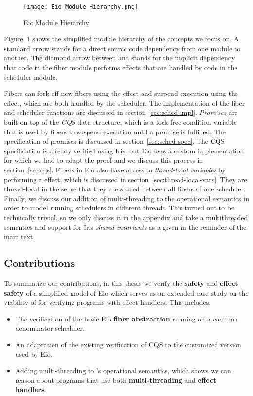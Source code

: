 \begin{figure}[ht]
  \centering
  \texttt{[image: Eio\_Module\_Hierarchy.png]}
  \caption{Eio Module Hierarchy}
  \label{fig:eio-module-hierarchy}
\end{figure}

Figure~\ref{fig:eio-module-hierarchy} shows the simplified module hierarchy of the concepts we focus on.
A standard arrow stands for a direct source code dependency from one module to another.
The diamond arrow between  and  stands for the implicit dependency that code in the fiber module performs effects that are handled by code in the scheduler module.

Fibers can fork off new fibers using the \efork{} effect and suspend execution using the \esuspend{} effect, which are both handled by the scheduler.
The implementation of the fiber and scheduler functions are discussed in section~\ref{sec:sched-impl}.
\textit{Promises} are built on top of the \textit{CQS} data structure, which is a lock-free condition variable that is used by fibers to suspend execution until a promise is fulfilled.
The specification of promises is discussed in section~\ref{sec:sched-spec}.
The CQS specification is already verified using Iris, but Eio uses a custom implementation for which we had to adapt the proof and we discuss this process in section~\ref{sec:cqs}.
Fibers in Eio also have access to \textit{thread-local variables} by performing a \egetctx{} effect, which is discussed in section~\ref{sec:thread-local-vars}.
They are thread-local in the sense that they are shared between all fibers of one scheduler.
Finally, we discuss our addition of multi-threading to the \hazel{} operational semantics in order to model running schedulers in different threads.
This turned out to be technically trivial, so we only discuss it in the appendix and take a multithreaded semantics and support for Iris \textit{shared invariants} as a given in the reminder of the main text.

\subsection{Contributions}
\label{sec:intro-contributions}

To summarize our contributions, in this thesis we verify the \textbf{safety} and \textbf{effect safety} of a simplified model of Eio which serves as an extended case study on the viability of \hazel{} for verifying programs with effect handlers.
This includes:

\begin{itemize}
  \item The verification of the basic Eio \textbf{fiber abstraction} running on a common denominator scheduler.
  \item An adaptation of the existing verification of CQS to the customized version used by Eio.
  \item Adding multi-threading to \hazel{}'s operational semantics, which shows we can reason about programs that use both \textbf{multi-threading} and \textbf{effect handlers}.
\end{itemize}

